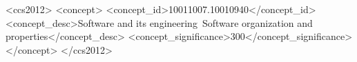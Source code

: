 \documentclass{sig-alternate-05-2015}
\begin{document}
%
%

\begin{CCSXML}
<ccs2012>
<concept>
<concept_id>10011007.10010940</concept_id>
<concept_desc>Software and its engineering~Software organization and properties</concept_desc>
<concept_significance>300</concept_significance>
</concept>
</ccs2012>
\end{CCSXML}



%
%

%
%
\printccsdesc


\end{document}
